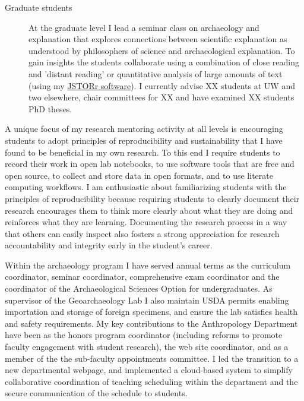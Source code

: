 \documentclass[11pt,article,oneside]{memoir}
\begin{document}
\begin{description}
\item[Graduate students] At the graduate level I lead a seminar class on archaeology and explanation that explores connections between scientific explanation as understood by philosophers of science and archaeological explanation. To gain insights the students collaborate using a combination of close reading and 'distant reading' or quantitative analysis of large amounts of text (using my \href{https://github.com/benmarwick/JSTORr}{JSTORr software}). I currently advise XX students at UW and two elsewhere, chair committees for XX and have examined XX students PhD theses.
  
\end{description}
    
A unique focus of my research mentoring activity at all levels is encouraging students to adopt principles of reproducibility and sustainability that I have found to be beneficial in my own research. To this end I require students to record their work in open lab notebooks, to use software tools that are free and open source, to collect and store data in open formats, and to use literate computing workflows. I am enthusiastic about familiarizing students with the principles of reproducibility because requiring students to clearly document their research encourages them to think more clearly about what they are doing and reinforces what they are learning. Documenting the research process in a way that others can easily inspect also fosters a strong appreciation for research accountability and integrity early in the student's career. 


\bigskip     


Within the archaeology program I have served annual terms as the curriculum coordinator, seminar coordinator, comprehensive exam coordinator and the coordinator of the Archaeological Sciences Option for undergraduates. As supervisor of the Geoarchaeology Lab I also maintain USDA permits enabling importation and storage of foreign specimens, and ensure the lab satisfies health and safety requirements. My key contributions to the Anthropology Department have been as the honors program coordinator (including reforms to promote faculty engagement with student research), the web site coordinator, and as a member of the the sub-faculty appointments committee. I led the transition to a new departmental webpage, and implemented a cloud-based system to simplify collaborative coordination of teaching scheduling within the department and the secure communication of the schedule to students. 
\end{document}
